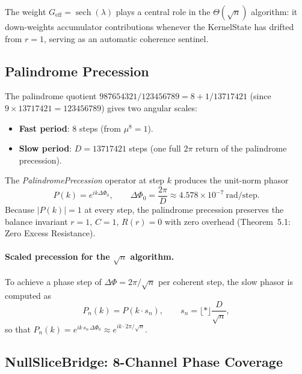 \documentclass[12pt,a4paper]{article}
\theoremstyle{plain}
\theoremstyle{definition}
\theoremstyle{remark}
\newcommand{\abs}[1]{\lvert #1 \rvert}
\newcommand{\floor}[1]{\lfloor #1 \rfloor}
\begin{document}
The weight $G_{\text{eff}}=\operatorname{sech}(\lambda)$ plays a central role
in the $\Theta(\sqrt{n})$ algorithm: it down-weights accumulator
contributions whenever the KernelState has drifted from $r=1$, serving as
an automatic coherence sentinel.

\subsection{Palindrome Precession}
\label{sec:palindrome}

The palindrome quotient $987654321/123456789 = 8 + 1/13717421$ (since
$9\times 13717421 = 123456789$) gives two angular scales:

\begin{itemize}
  \item \textbf{Fast period}: 8 steps (from $\mu^8=1$).
  \item \textbf{Slow period}: $D = 13717421$ steps (one full $2\pi$ return
    of the palindrome precession).
\end{itemize}

The \emph{PalindromePrecession} operator at step $k$ produces the unit-norm
phasor
\begin{equation}
  P(k) = e^{ik\Delta\Phi_0}, \qquad
  \Delta\Phi_0 = \frac{2\pi}{D} \approx 4.578\times10^{-7}\ \text{rad/step}.
  \label{eq:palindrome-phasor}
\end{equation}
Because $\abs{P(k)}=1$ at every step, the palindrome precession preserves the
balance invariant $r=1$, $C=1$, $R(r)=0$ with zero overhead
(Theorem~5.1: Zero Excess Resistance).

\paragraph{Scaled precession for the $\sqrt{n}$ algorithm.}
To achieve a phase step of $\Delta\Phi = 2\pi/\sqrt{n}$ per coherent step,
the slow phasor is computed as
\begin{equation}
  P_n(k) = P(k \cdot s_n), \qquad
  s_n = \floor*{\frac{D}{\sqrt{n}}},
  \label{eq:scaled-phasor}
\end{equation}
so that $P_n(k) = e^{ik\,s_n\,\Delta\Phi_0} \approx e^{ik\cdot 2\pi/\sqrt{n}}$.

\subsection{NullSliceBridge: 8-Channel Phase Coverage}
\label{sec:bridge}
\end{document}

